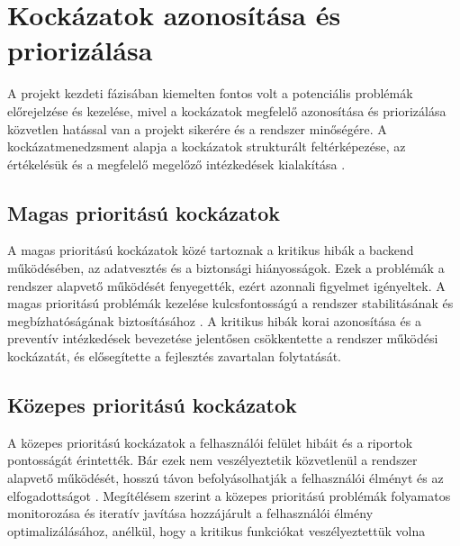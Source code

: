 \section{Kockázatok azonosítása és priorizálása}

A projekt kezdeti fázisában kiemelten fontos volt a potenciális problémák előrejelzése és kezelése, 
mivel a kockázatok megfelelő azonosítása és priorizálása közvetlen hatással van a projekt sikerére 
és a rendszer minőségére. A kockázatmenedzsment alapja a kockázatok strukturált feltérképezése, 
az értékelésük és a megfelelő megelőző intézkedések kialakítása \cite{Hajdu2014,Szalay2018,Kovacs2016}.

\subsection{Magas prioritású kockázatok}

A magas prioritású kockázatok közé tartoznak a kritikus hibák a backend működésében, az adatvesztés és a biztonsági hiányosságok.  
Ezek a problémák a rendszer alapvető működését fenyegették, ezért azonnali figyelmet igényeltek.  
A magas prioritású problémák kezelése kulcsfontosságú a rendszer stabilitásának és megbízhatóságának biztosításához \cite{Kaposi2019,Szalay2018}.  
A kritikus hibák korai azonosítása és a preventív intézkedések bevezetése jelentősen csökkentette 
a rendszer működési kockázatát, és elősegítette a fejlesztés zavartalan folytatását.

\subsection{Közepes prioritású kockázatok}

A közepes prioritású kockázatok a felhasználói felület hibáit és a riportok pontosságát érintették.  
Bár ezek nem veszélyeztetik közvetlenül a rendszer alapvető működését, hosszú távon befolyásolhatják 
a felhasználói élményt és az elfogadottságot \cite{Hajdu2014,Kovacs2016}.  
Megítélésem szerint a közepes prioritású problémák folyamatos monitorozása és iteratív javítása hozzájárult a felhasználói élmény optimalizálásához, 
anélkül, hogy a kritikus funkciókat veszélyeztettük volna
